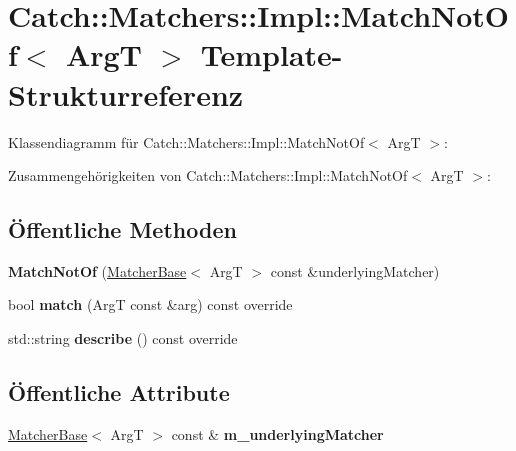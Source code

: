 \hypertarget{structCatch_1_1Matchers_1_1Impl_1_1MatchNotOf}{}\section{Catch\+:\+:Matchers\+:\+:Impl\+:\+:Match\+Not\+Of$<$ ArgT $>$ Template-\/\+Strukturreferenz}
\label{structCatch_1_1Matchers_1_1Impl_1_1MatchNotOf}


Klassendiagramm für Catch\+:\+:Matchers\+:\+:Impl\+:\+:Match\+Not\+Of$<$ ArgT $>$\+:


Zusammengehörigkeiten von Catch\+:\+:Matchers\+:\+:Impl\+:\+:Match\+Not\+Of$<$ ArgT $>$\+:
\subsection*{Öffentliche Methoden}
\begin{DoxyCompactItemize}
\item 
\mbox{\label{structCatch_1_1Matchers_1_1Impl_1_1MatchNotOf_a47afdd9e4c3354cef85adc3186097ae4}} 
{\bfseries Match\+Not\+Of} (\hyperlink{structCatch_1_1Matchers_1_1Impl_1_1MatcherBase}{Matcher\+Base}$<$ ArgT $>$ const \&underlying\+Matcher)
\item 
\mbox{\label{structCatch_1_1Matchers_1_1Impl_1_1MatchNotOf_a181d693c0258e582d80dc6117a1f2b66}} 
bool {\bfseries match} (ArgT const \&arg) const override
\item 
\mbox{\label{structCatch_1_1Matchers_1_1Impl_1_1MatchNotOf_ac5fb4ef6a9069d23a4098c3c818f06b0}} 
std\+::string {\bfseries describe} () const override
\end{DoxyCompactItemize}
\subsection*{Öffentliche Attribute}
\begin{DoxyCompactItemize}
\item 
\mbox{\label{structCatch_1_1Matchers_1_1Impl_1_1MatchNotOf_af7ac67f112b0e93796b048a47329aad4}} 
\hyperlink{structCatch_1_1Matchers_1_1Impl_1_1MatcherBase}{Matcher\+Base}$<$ ArgT $>$ const  \& {\bfseries m\+\_\+underlying\+Matcher}
\end{DoxyCompactItemize}
